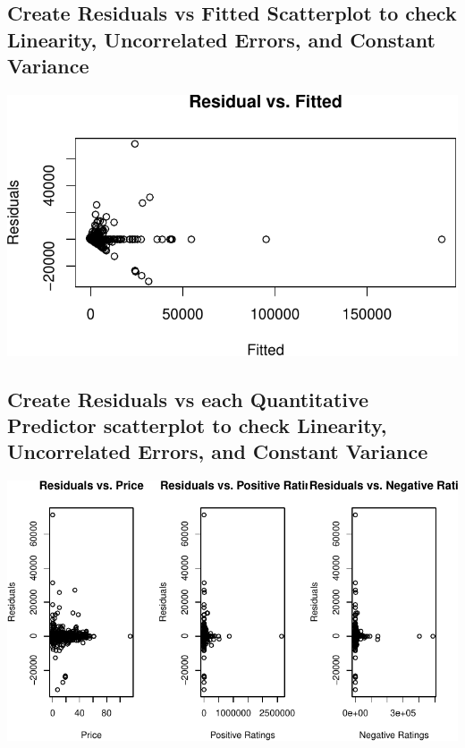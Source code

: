 \documentclass[
  letterpaper,
  DIV=11,
  numbers=noendperiod]{scrartcl}
\begin{document}
\hypertarget{create-residuals-vs-fitted-scatterplot-to-check-linearity-uncorrelated-errors-and-constant-variance}{%
\subsection{Create Residuals vs Fitted Scatterplot to check Linearity,
Uncorrelated Errors, and Constant
Variance}\label{create-residuals-vs-fitted-scatterplot-to-check-linearity-uncorrelated-errors-and-constant-variance}}

\includegraphics{proposal_files/figure-pdf/unnamed-chunk-8-1.pdf}

\hypertarget{create-residuals-vs-each-quantitative-predictor-scatterplot-to-check-linearity-uncorrelated-errors-and-constant-variance}{%
\subsection{Create Residuals vs each Quantitative Predictor scatterplot
to check Linearity, Uncorrelated Errors, and Constant
Variance}\label{create-residuals-vs-each-quantitative-predictor-scatterplot-to-check-linearity-uncorrelated-errors-and-constant-variance}}

\includegraphics{proposal_files/figure-pdf/unnamed-chunk-9-1.pdf}
\end{document}
